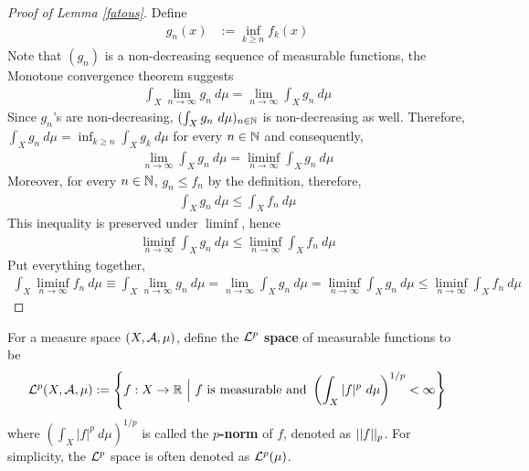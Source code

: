 \documentclass[11pt]{article}
\begin{document}
	\begin{proof}[Proof of Lemma \ref{fatous}]
	    Define
	    \begin{align}
	        g_n(x) &:= \inf_{k \geq n} f_k(x)
	    \end{align}
	    Note that $(g_n)$ is a non-decreasing sequence of measurable functions, the Monotone convergence theorem suggests
	    \begin{align}
	        \int_X \lim_{n \to \infty} g_n\ d\mu
	        = \lim_{n\to\infty} \int_X g_n\ d\mu
	    \end{align}
	    Since $g_n$'s are non-decreasing, $(\int_X g_n\ d\mu)_{n \in \mathbb{N}}$ is non-decreasing as well.
	    Therefore, $\int_X g_n\ d\mu = \inf_{k \geq n} \int_X g_k\ d\mu$ for every $n \in \mathbb{N}$ and consequently,
	    \begin{align}
	        \lim_{n\to\infty}\int_X g_n\ d\mu = \liminf_{n\to\infty}\int_X g_n\ d\mu
	    \end{align}
	    Moreover, for every $n \in \mathbb{N}$, $g_n \leq f_n$ by the definition, therefore,
	    \begin{align}
	        \int_X g_n\ d\mu \leq \int_X f_n\ d\mu
	    \end{align}
	    This inequality is preserved under $\liminf$, hence
	    \begin{align}
	        \liminf_{n\to\infty}\int_X g_n\ d\mu \leq \liminf_{n\to\infty}\int_X f_n\ d\mu
	    \end{align}
	    Put everything together, 
	    \begin{align}
	        \int_X \liminf_{n \to \infty}f_n\ d\mu
	        \equiv\int_X \lim_{n \to \infty} g_n\ d\mu
	        = \lim_{n\to\infty} \int_X g_n\ d\mu
	        = \liminf_{n\to\infty}\int_X g_n\ d\mu
	        \leq \liminf_{n\to\infty}\int_X f_n\ d\mu
	    \end{align}
	\end{proof}
	
	\begin{definition}
	    For a measure space $(X, \mathcal{{A}}, \mu)$, define the \textbf{$\mathcal{{L}}^p$ space} of measurable functions to be
	    \begin{align}
	        \mc{L}^p(X, \mc{A}, \mu) := 
	        \left\{
	            f: X \to \R\ \Big|\ 
	            f \tx{ is measurable and }
	            \left(\int_X |f|^p\ d\mu \right)^{1/p} < \infty
	        \right\}
	    \end{align}
	    where $\left(\int_X |f|^p\ d\mu \right)^{1/p}$ is called the \textbf{$p$-norm} of $f$, denoted as $\vert \vert {f} \vert \vert_p$. For simplicity, the $\mathcal{{L}}^p$ space is often denoted as $\mathcal{{L}}^p(\mu)$.
	\end{definition}
	
\end{document}
